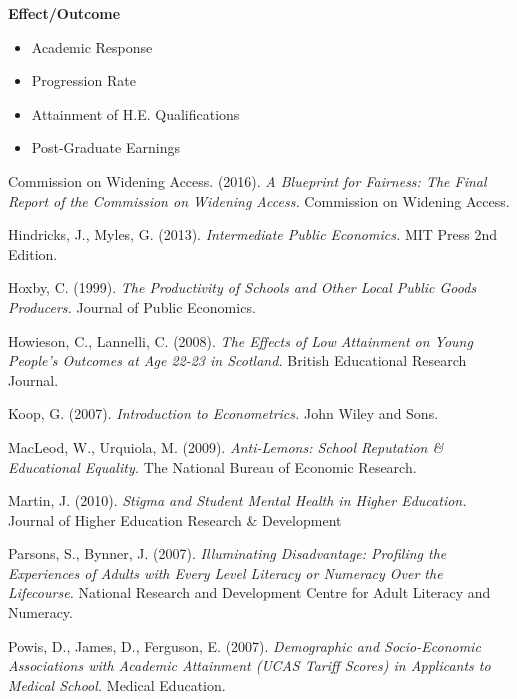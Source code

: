 \documentclass[11pt, english]{article}
\begin{document}
	\textbf{Effect/Outcome}
        \begin{itemize}                               
        \setlength\itemsep{0cm}            
                \item Academic Response 
                \item Progression Rate
                \item Attainment of H.E. Qualifications
                \item Post-Graduate Earnings
        \end{itemize}

\newpage

	\renewcommand\refname{Bibliography}

        \begin{thebibliography}{9}

		Commission on Widening Access. (2016).
		\textsl{A Blueprint for Fairness: The Final Report of the Commission on Widening Access.}
		Commission on Widening Access.

		Hindricks, J., Myles, G. (2013).
		\textsl{Intermediate Public Economics.}
		MIT Press 2nd Edition.
	
		Hoxby, C. (1999).
		\textsl{The Productivity of Schools and Other Local Public Goods Producers.}
		Journal of Public Economics.

		Howieson, C., Lannelli, C. (2008).
		\textsl{The Effects of Low Attainment on Young People's Outcomes at Age 22-23 in Scotland.}
		British Educational Research Journal.

		Koop, G. (2007).
		\textsl{Introduction to Econometrics.}
		John Wiley and Sons.

		MacLeod, W., Urquiola, M. (2009).
		\textsl{Anti-Lemons: School Reputation \& Educational Equality.}
		The National Bureau of Economic Research.

		Martin, J. (2010).
		\textsl{Stigma and Student Mental Health in Higher Education.}
		Journal of Higher Education Research \& Development

		Parsons, S., Bynner, J. (2007).
		\textsl{Illuminating Disadvantage: Profiling the Experiences of Adults with Every Level Literacy or Numeracy Over the Lifecourse.}
		National Research and Development Centre for Adult Literacy and Numeracy.

		Powis, D., James, D., Ferguson, E. (2007).
		\textsl{Demographic and Socio-Economic Associations with Academic Attainment (UCAS Tariff Scores) in Applicants to Medical School.}
		Medical Education.


\end{thebibliography}
\end{document}
